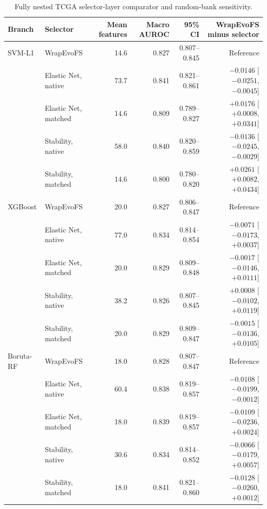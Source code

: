 \begin{table}[H]
\centering
\caption{Fully nested TCGA selector-layer comparator and random-bank sensitivity.}
\label{tab:supp6}
\scriptsize
\setlength{\tabcolsep}{3.4pt}
\renewcommand{\arraystretch}{1.08}
\begin{tabular}{llrrrr}
\toprule
Branch & Selector & Mean features & Macro AUROC & 95\% CI & WrapEvoFS minus selector \tabularnewline
\midrule
SVM-L1 & WrapEvoFS & 14.6 & 0.827 & 0.807--0.845 & Reference \\
 & Elastic Net, native & 73.7 & 0.841 & 0.821--0.861 & $-0.0146$ [$-0.0251$, $-0.0045$] \\
 & Elastic Net, matched & 14.6 & 0.809 & 0.789--0.827 & $+0.0176$ [$+0.0008$, $+0.0341$] \\
 & Stability, native & 58.0 & 0.840 & 0.820--0.859 & $-0.0136$ [$-0.0245$, $-0.0029$] \\
 & Stability, matched & 14.6 & 0.800 & 0.780--0.820 & $+0.0261$ [$+0.0082$, $+0.0434$] \\
\addlinespace
XGBoost & WrapEvoFS & 20.0 & 0.827 & 0.806--0.847 & Reference \\
 & Elastic Net, native & 77.0 & 0.834 & 0.814--0.854 & $-0.0071$ [$-0.0173$, $+0.0037$] \\
 & Elastic Net, matched & 20.0 & 0.829 & 0.809--0.848 & $-0.0017$ [$-0.0146$, $+0.0111$] \\
 & Stability, native & 38.2 & 0.826 & 0.807--0.845 & $+0.0008$ [$-0.0102$, $+0.0119$] \\
 & Stability, matched & 20.0 & 0.829 & 0.809--0.847 & $-0.0015$ [$-0.0136$, $+0.0105$] \\
\addlinespace
Boruta-RF & WrapEvoFS & 18.0 & 0.828 & 0.807--0.847 & Reference \\
 & Elastic Net, native & 60.4 & 0.838 & 0.819--0.857 & $-0.0108$ [$-0.0199$, $-0.0012$] \\
 & Elastic Net, matched & 18.0 & 0.839 & 0.819--0.857 & $-0.0109$ [$-0.0236$, $+0.0024$] \\
 & Stability, native & 30.6 & 0.834 & 0.814--0.852 & $-0.0066$ [$-0.0179$, $+0.0057$] \\
 & Stability, matched & 18.0 & 0.841 & 0.821--0.860 & $-0.0128$ [$-0.0260$, $+0.0012$] \\
\bottomrule
\end{tabular}


\end{table}

